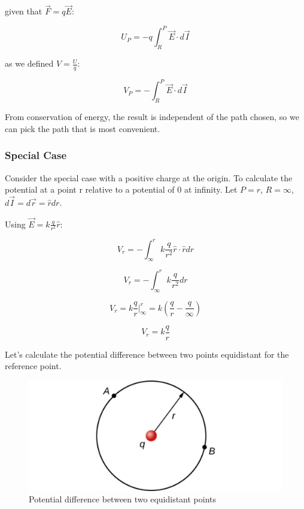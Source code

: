 \documentclass[14pt]{memoir}
\begin{document}
given that $\vec{F} = q \vec{E}$:

\begin{equation}
U_P = -q \int_{R}^{P} \vec{E} \cdot d\vec{I}
\end{equation}

as we defined $V = \frac{U}{q}$:

\begin{equation}
V_P = - \int_{R}^{P} \vec{E} \cdot d\vec{I}
\end{equation}

From conservation of energy, the result is independent of the path chosen, so we can pick the path that is most convenient. 

\subsubsection{Special Case}

Consider the special case with a positive charge at the origin. To calculate the potential at a point r relative to a potential of 0 at infinity. Let $P = r$, $R = \infty$, $d\vec{I} = d\vec{r} = \hat{r}dr$.

Using $\vec{E} = k\frac{q}{r^2}\hat{r}$:

\begin{equation}
V_r = -\int_{\infty}^r k\frac{q}{r^2} \hat{r} \cdot \hat{r} dr
\end{equation}

\begin{equation}
V_r = -\int_{\infty}^r k\frac{q}{r^2} dr
\end{equation}  

\begin{equation}
V_r = k\frac{q}{r} \bigg\rvert_{\infty}^{r} = k(\frac{q}{r} - \frac{q}{\infty})
\end{equation} 

\begin{equation}
V_r = k\frac{q}{r}
\end{equation} 

Let's calculate the potential difference between two points equidistant for the reference point. 

\begin{figure}[H]
\begin{center}
\includegraphics[scale=0.30]{fig/fig_07_15.jpg}
\caption{Potential difference between two equidistant points}
\label{fig:07_15}
\end{center}
\end{figure}
\end{document}
